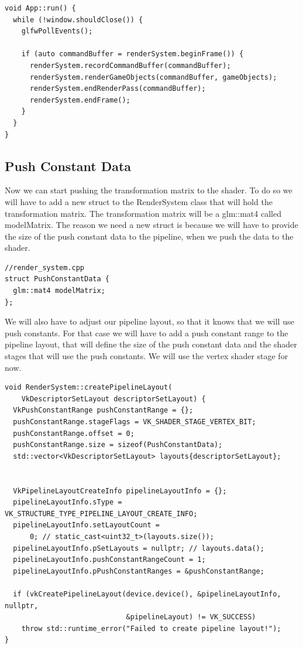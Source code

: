 \documentclass[12pt]{report} \usepackage{preamble}
\begin{document}
\begin{lstlisting}[Language=C++]
void App::run() {
  while (!window.shouldClose()) {
    glfwPollEvents();

    if (auto commandBuffer = renderSystem.beginFrame()) {
      renderSystem.recordCommandBuffer(commandBuffer);
      renderSystem.renderGameObjects(commandBuffer, gameObjects);
      renderSystem.endRenderPass(commandBuffer);
      renderSystem.endFrame();
    }
  }
}
\end{lstlisting}

\subsection{Push Constant Data}

Now we can start pushing the transformation matrix to the shader. To do so we will have to add a new struct to the RenderSystem class that will hold the transformation matrix.
The transformation matrix will be a glm::mat4 called modelMatrix. The reason we need a new struct is because we will have to provide the size of the push constant data to the pipeline,
when we push the data to the shader.

\begin{lstlisting}[Language=C++]
//render_system.cpp
struct PushConstantData {
  glm::mat4 modelMatrix;
};
\end{lstlisting}

We will also have to adjust our pipeline layout, so that it knows that we will use push constants. For that case we will have to add a push constant range to the pipeline layout,
that will define the size of the push constant data and the shader stages that will use the push constants. We will use the vertex shader stage for now.

\begin{lstlisting}[Language=C++]
void RenderSystem::createPipelineLayout(
    VkDescriptorSetLayout descriptorSetLayout) {
  VkPushConstantRange pushConstantRange = {};
  pushConstantRange.stageFlags = VK_SHADER_STAGE_VERTEX_BIT;
  pushConstantRange.offset = 0;
  pushConstantRange.size = sizeof(PushConstantData);
  std::vector<VkDescriptorSetLayout> layouts{descriptorSetLayout};


  VkPipelineLayoutCreateInfo pipelineLayoutInfo = {};
  pipelineLayoutInfo.sType = VK_STRUCTURE_TYPE_PIPELINE_LAYOUT_CREATE_INFO;
  pipelineLayoutInfo.setLayoutCount =
      0; // static_cast<uint32_t>(layouts.size());
  pipelineLayoutInfo.pSetLayouts = nullptr; // layouts.data();
  pipelineLayoutInfo.pushConstantRangeCount = 1;
  pipelineLayoutInfo.pPushConstantRanges = &pushConstantRange;

  if (vkCreatePipelineLayout(device.device(), &pipelineLayoutInfo, nullptr,
                             &pipelineLayout) != VK_SUCCESS)
    throw std::runtime_error("Failed to create pipeline layout!");
}
\end{lstlisting}
\end{document}
